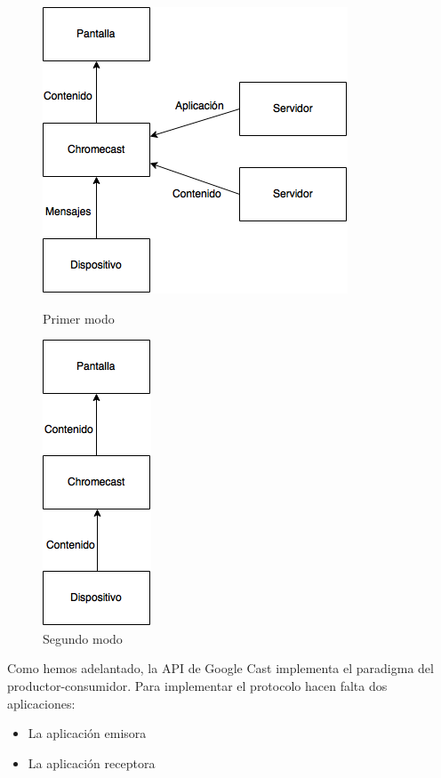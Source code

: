 \begin{figure}[h]
	\centering
	\begin{minipage}[b]{.35\textwidth}
		\centering
		\includegraphics[scale=0.6]{./Imagenes/ChromecastModo1.png}
		\caption{Primer modo}\label{fig:modo1}
	\end{minipage}\qquad
	\hspace{1.5cm}
	\begin{minipage}[b]{.35\textwidth}
		\centering
		\includegraphics[scale=0.6]{./Imagenes/ChromecastModo2.png}
		\caption{Segundo modo}\label{fig:modo2}
	\end{minipage}
\end{figure}

Como hemos adelantado, la API de Google Cast implementa el paradigma del productor-consumidor. Para implementar el protocolo hacen falta dos aplicaciones:

\begin{itemize}
	\item La aplicación emisora
	\item La aplicación receptora
\end{itemize}

